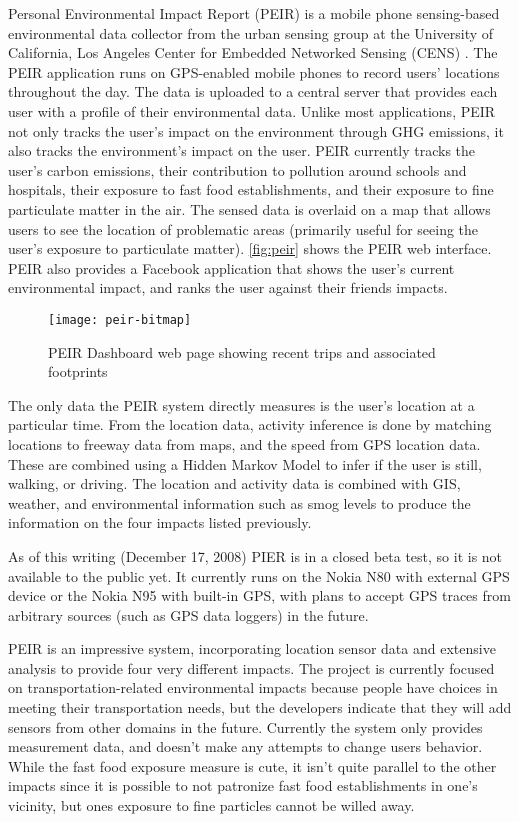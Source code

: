 Personal Environmental Impact Report (PEIR) is a mobile phone sensing-based environmental data collector from the urban sensing group at the University of California, Los Angeles Center for Embedded Networked Sensing (CENS) \cite{peir-website, agapie-2008-seeing-our-signals}. The PEIR application runs on GPS-enabled mobile phones to record users' locations throughout the day. The data is uploaded to a central server that provides each user with a profile of their environmental data. Unlike most applications, PEIR not only tracks the user's impact on the environment through GHG emissions, it also tracks the environment's impact on the user. PEIR currently tracks the user's carbon emissions, their contribution to pollution around schools and hospitals, their exposure to fast food establishments, and their exposure to fine particulate matter in the air. The sensed data is overlaid on a map that allows users to see the location of problematic areas (primarily useful for seeing the user's exposure to particulate matter). \autoref{fig:peir} shows the PEIR web interface. PEIR also provides a Facebook application that shows the user's current environmental impact, and ranks the user against their friends impacts.

\begin{figure}[htbp]
	\begin{center}
		\texttt{[image: peir-bitmap]}
		\caption{PEIR Dashboard web page showing recent trips and associated footprints}
		\label{fig:peir}
 	\end{center}
\end{figure}

The only data the PEIR system directly measures is the user's location at a particular time. From the location data, activity inference is done by matching locations to freeway data from maps, and the speed from GPS location data. These are combined using a Hidden Markov Model to infer if the user is still, walking, or driving. The location and activity data is combined with GIS, weather, and environmental information such as smog levels to produce the information on the four impacts listed previously.

As of this writing (December 17, 2008) PIER is in a closed beta test, so it is not available to the public yet. It currently runs on the Nokia N80 with external GPS device or the Nokia N95 with built-in GPS, with plans to accept GPS traces from arbitrary sources (such as GPS data loggers) in the future.

PEIR is an impressive system, incorporating location sensor data and extensive analysis to provide four very different impacts. The project is currently focused on transportation-related environmental impacts because people have  choices in meeting their transportation needs, but the developers indicate that they will add sensors from other domains in the future. Currently the system only provides measurement data, and doesn't make any attempts to change users behavior. While the fast food exposure measure is cute, it isn't quite parallel to the other impacts since it is possible to not patronize fast food establishments in one's vicinity, but ones exposure to fine particles cannot be willed away.

